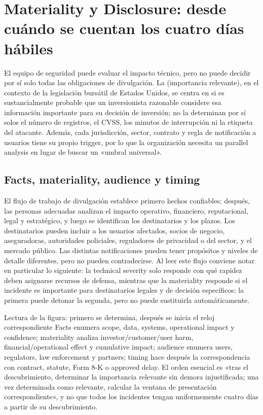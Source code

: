 \section{Materiality y Disclosure: desde cuándo se cuentan los cuatro días hábiles}

El equipo de seguridad puede evaluar el impacto técnico, pero no puede decidir por sí solo todas las obligaciones de divulgación. La  (importancia relevante), en el contexto de la legislación bursátil de Estados Unidos, se centra en si es sustancialmente probable que un inversionista razonable considere esa información importante para su decisión de inversión; no la determinan por sí solos el número de registros, el CVSS, los minutos de interrupción ni la etiqueta del atacante. Además, cada jurisdicción, sector, contrato y regla de notificación a usuarios tiene su propio trigger, por lo que la organización necesita un parallel analysis en lugar de buscar un «umbral universal».

\subsection{Facts, materiality, audience y timing}

El flujo de trabajo de divulgación establece primero hechos confiables; después, las personas adecuadas analizan el impacto operativo, financiero, reputacional, legal y estratégico, y luego se identifican los destinatarios y los plazos. Los destinatarios pueden incluir a los usuarios afectados, socios de negocio, aseguradoras, autoridades policiales, reguladores de privacidad o del sector, y el mercado público. Las distintas notificaciones pueden tener propósitos y niveles de detalle diferentes, pero no pueden contradecirse. Al leer este flujo conviene notar en particular lo siguiente: la technical severity solo responde con qué rapidez deben asignarse recursos de defensa, mientras que la materiality responde si el incidente es importante para destinatarios legales y de decisión específicos; la primera puede detonar la segunda, pero no puede sustituirla automáticamente.


\begin{knowledgebox}{Lectura de la figura: primero se determina, después se inicia el reloj correspondiente}
Facts enumera scope, data, systems, operational impact y confidence; materiality analiza investor/customer/user harm, financial/operational effect y cumulative impact; audience enumera users, regulators, law enforcement y partners; timing hace después la correspondencia con contract, statute, Form 8-K o approved delay. El orden esencial es «tras el descubrimiento, determinar la importancia relevante sin demora injustificada; una vez determinada como relevante, calcular la ventana de presentación correspondiente», y no que todos los incidentes tengan uniformemente cuatro días a partir de su descubrimiento.
\end{knowledgebox}


